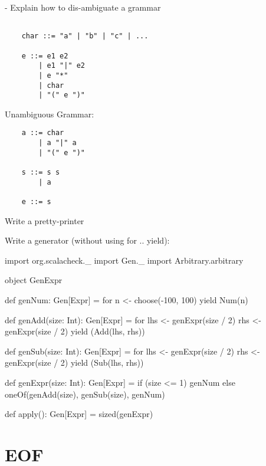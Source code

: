\documentclass[9pt]{extbook}
\begin{document}
- Explain how to dis-ambiguate a grammar

\begin{verbatim}

    char ::= "a" | "b" | "c" | ...

    e ::= e1 e2
        | e1 "|" e2
        | e "*"
        | char
        | "(" e ")"
\end{verbatim}

Unambiguous Grammar:

\begin{verbatim}
    a ::= char
        | a "|" a
        | "(" e ")"

    s ::= s s
        | a

    e ::= s
\end{verbatim}

Write a pretty-printer


Write a generator (without using for .. yield):

\begin{scalacode}
  import org.scalacheck._
  import Gen._
  import Arbitrary.arbitrary

  object GenExpr {

    def genNum: Gen[Expr] = for {
      n <- choose(-100, 100)
    } yield Num(n)

    def genAdd(size: Int): Gen[Expr] = for {
      lhs <- genExpr(size / 2)
      rhs <- genExpr(size / 2)
    } yield (Add(lhs, rhs))

    def genSub(size: Int): Gen[Expr] = for {
      lhs <- genExpr(size / 2)
      rhs <- genExpr(size / 2)
    } yield (Sub(lhs, rhs))

    def genExpr(size: Int): Gen[Expr] = {
      if (size <= 1) {
        genNum
      }
      else {
        oneOf(genAdd(size), genSub(size), genNum)
      }
    }

    def apply(): Gen[Expr] = sized(genExpr)

  }
\end{scalacode}

\chapter{EOF}
\end{document}
